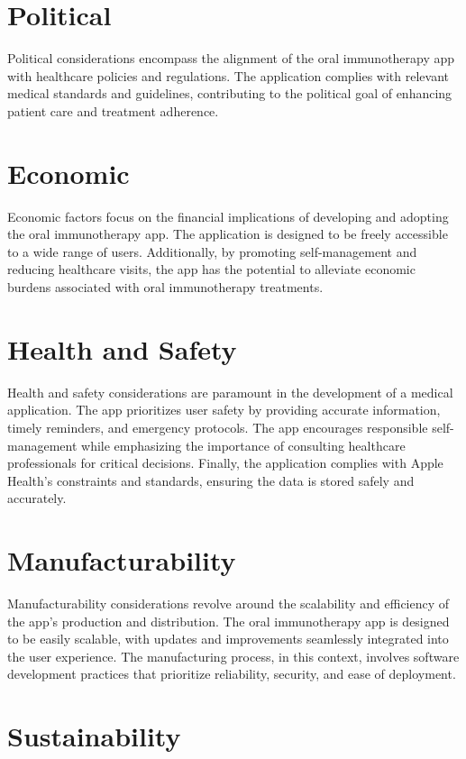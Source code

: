 \section{Political}

Political considerations encompass the alignment of the oral immunotherapy app with healthcare policies and regulations. The application complies with relevant medical standards and guidelines, contributing to the political goal of enhancing patient care and treatment adherence.

\section{Economic}

Economic factors focus on the financial implications of developing and adopting the oral immunotherapy app. The application is designed to be freely accessible to a wide range of users. Additionally, by promoting self-management and reducing healthcare visits, the app has the potential to alleviate economic burdens associated with oral immunotherapy treatments.

\section{Health and Safety}

Health and safety considerations are paramount in the development of a medical application. The app prioritizes user safety by providing accurate information, timely reminders, and emergency protocols. The app encourages responsible self-management while emphasizing the importance of consulting healthcare professionals for critical decisions. Finally, the application complies with Apple Health's constraints and standards, ensuring the data is stored safely and accurately.

\section{Manufacturability}

Manufacturability considerations revolve around the scalability and efficiency of the app's production and distribution. The oral immunotherapy app is designed to be easily scalable, with updates and improvements seamlessly integrated into the user experience. The manufacturing process, in this context, involves software development practices that prioritize reliability, security, and ease of deployment.

\section{Sustainability}

